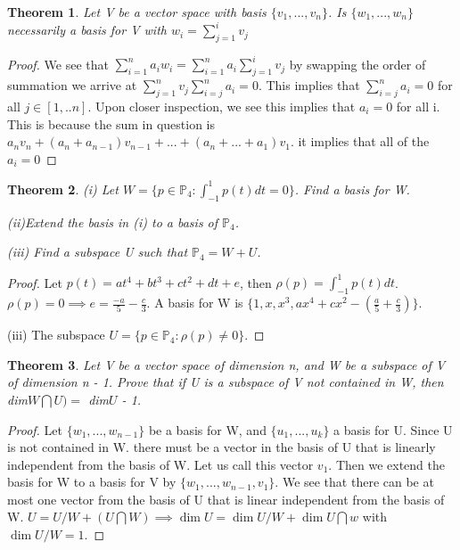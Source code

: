 \documentclass{article}
\theoremstyle{plain}
\newtheorem{theorem}{Theorem}
\theoremstyle{definition}
\begin{document}
\begin{theorem}
Let V be a vector space with basis $\{v_{1},...,v_{n}\}$. Is $\{ w_{1},...,w_{n} \}$ necessarily a basis for V with $w_{i} = \sum_{j = 1}^{i} v_{j}$
\end{theorem}

\begin{proof}
We see that $\sum_{i = 1}^{n} a_{i}w_{i} = \sum_{i = 1}^{n} a_{i}\sum_{j = 1}^{i} v_{j}$ by swapping the order of summation we arrive at $\sum_{j = 1}^{n} v_{j}\sum_{i = j}^{n} a_{i} = 0$. This implies that $\sum_{i = j}^{n} a_{i} = 0$ for all $j \in [1,..n]$. Upon closer inspection, we see this implies that $a_{i} = 0$ for all i. This is because the sum in question is $a_{n}v_{n} + (a_{n} + a_{n - 1})v_{n - 1} + ... + (a_{n} + ... + a_{1})v_{1}$. it implies that all of the $a_{i} = 0$
\end{proof}

\begin{theorem}
(i) Let $W = \{ p \in \mathbb{P}_{4}: \int_{-1}^{1} p(t)dt = 0\}$. Find a basis for W.

(ii)Extend the basis in (i) to a basis of $\mathbb{P}_{4}$.

(iii) Find a subspace U such that $\mathbb{P}_{4} = W + U$.
\end{theorem}

\begin{proof}
	Let $p(t) = at^{4} + bt^{3} + ct^{2} + dt + e$, then $\rho(p) = \int_{-1}^{1} p(t) dt$. $ \rho(p) = 0 \implies e = \frac
	{-a}{5} - \frac{c}{3}$. A basis for W is $\{ 1, x, x^{3}, ax^{4} + cx^{2} - (\frac{a}{5} + \frac{c}{3})\}$.

	(iii) The subspace $U = \{p \in \mathbb{P}_{4}: \rho(p) \not = 0\}$.
\end{proof}
\begin{theorem}
Let V be a vector space of dimension n, and W be a subspace of V of dimension n - 1. Prove that if U is a subspace of V not contained in W, then dim$W \bigcap U) =$ dim$U$ - 1.
\end{theorem}

\begin{proof}
	Let $\{w_{1},...,w_{n-1}\}$ be a basis for W, and $\{ u_{1},...,u_{k}\}$ a basis for U. Since U is not contained in W. there must be a vector in the basis of U that is linearly independent from the basis of W. Let us call this vector $v_{1}$. Then we extend the basis for W to a basis for V by $\{ w_{1},...,w_{n - 1},v_{1}\}$. We see that there can be at most one vector from the basis of U that is linear independent from the basis of W. $U = U/W + (U \bigcap W) \implies \dim{U} = \dim{U/W} + \dim{U \bigcap w}$ with $\dim{U/W} = 1$. 
\end{proof}
\end{document}

